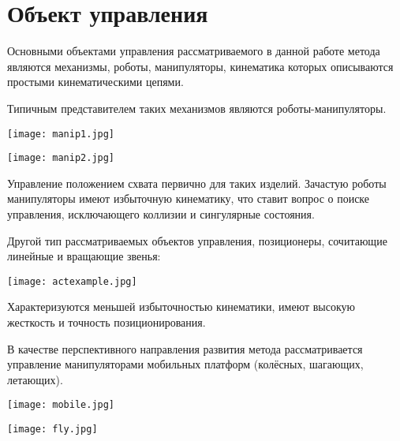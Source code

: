 \section{Объект управления}

Основными объектами управления рассматриваемого в данной работе метода являются механизмы, роботы, манипуляторы, кинематика которых описываются простыми кинематическими цепями.

Типичным представителем таких механизмов являются роботы-манипуляторы.

\begin{center}
  \texttt{[image: manip1.jpg]}
  \label{}
\end{center}

\begin{center}
  \texttt{[image: manip2.jpg]}
  \label{}
\end{center}

Управление положением схвата первично для таких изделий. Зачастую роботы манипуляторы имеют избыточную кинематику, что ставит вопрос о поиске управления, исключающего коллизии и сингулярные состояния.

Другой тип рассматриваемых объектов управления, позиционеры, сочитающие линейные и вращающие звенья:

\begin{center}
  \texttt{[image: actexample.jpg]}
  \label{}
\end{center}

Характеризуются меньшей избыточностью кинематики, имеют высокую жесткость и точность позиционирования.

В качестве перспективного направления развития метода рассматривается управление манипуляторами мобильных платформ (колёсных, шагающих, летающих).

\begin{center}
  \texttt{[image: mobile.jpg]}
  \label{}
\end{center}

\begin{center}
  \texttt{[image: fly.jpg]}
  \label{}
\end{center}

